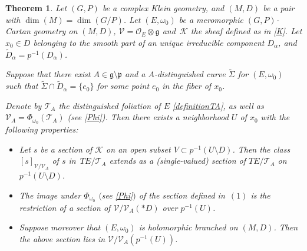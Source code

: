 \documentclass[pdftex]{sigma}
\numberwithin{equation}{section}
\newtheorem{Theorem}{Theorem}[section]
\begin{document}
\begin{Theorem}\label{Lie-Cartan} Let $(G,P)$ be a complex Klein geometry, and $(M,D)$ be a pair with $\dim(M)=\dim(G/P)$. Let $(E,\omega_0)$ be a meromorphic $(G,P)$-Cartan geometry on $(M,D)$, $\mathcal{V}=\mathcal{O}_E\otimes \mathfrak{g}$ and~$\mathcal{K}$ the sheaf defined as in \eqref{K}. Let $x_0 \in D$ belonging to the smooth part of an unique irreducible component $D_\alpha$, and $\tilde{D}_\alpha = p^{-1}(D_\alpha)$.

Suppose that there exist $A\in \mathfrak{g}\setminus \mathfrak{p}$ and a $A$-distinguished curve $\tilde{\Sigma}$ for $(E,\omega_0)$ such that $\tilde{\Sigma}\cap \tilde{D}_\alpha= \{e_0\}$ for some point $e_0$ in the fiber of $x_0$.

Denote by $\mathcal{T}_A$ the distinguished foliation of $E$ \eqref{definitionTA}, as well as $\mathcal{V}_A=\Phi_{\omega_0}(\mathcal{T}_A)$ \textup{(}see \eqref{Phi}{\rm )}. Then there exists a neighborhood $U$ of $x_0$ with the following properties:
 \begin{itemize}\itemsep=0pt
 \item[$(1)$] Let $s$ be a section of $\mathcal{K}$ on an open subset $V\subset p^{-1}(U\setminus D)$. Then the class $[s]_{\mathcal{V}/\mathcal{V}_A}$ of $s$ in~$TE/\mathcal{T}_A$ extends as a (single-valued) section of $TE/\mathcal{T}_A$ on $p^{-1}(U\setminus D)$.
 \item[$(2)$] The image under $\Phi_{\omega_0}$ $($see \eqref{Phi}$)$ of the section defined in~$(1)$ is the restriction of a section of $\mathcal{V}/\mathcal{V}_A(* D)$ over $p^{-1}(U)$.
\item[$(3)$] Suppose moreover that $(E,\omega_0)$ is holomorphic branched on $(M,D)$. Then the above section lies in $\mathcal{V}/\mathcal{V}_A(p^{-1}(U))$. \end{itemize}
\end{Theorem}
\end{document}
